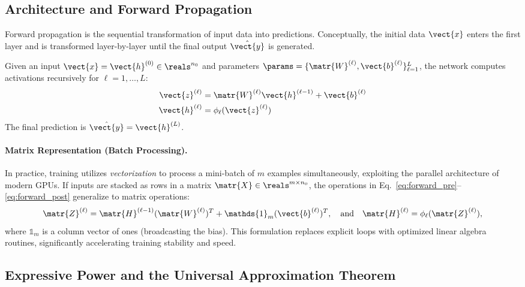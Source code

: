 \subsection{Architecture and Forward Propagation}

Forward propagation is the sequential transformation of input data into predictions. Conceptually, the initial data $\vect{x}$ enters the first layer and is transformed layer-by-layer until the final output $\hat{\vect{y}}$ is generated.

\begin{definition}
    Given an input $\vect{x} = \vect{h}^{(0)} \in \reals^{n_0}$ and parameters $\params = \{\matr{W}^{(\ell)}, \vect{b}^{(\ell)}\}_{\ell=1}^L$, the network computes activations recursively for $\ell = 1, \ldots, L$:
    \begin{align}
        \vect{z}^{(\ell)} &= \matr{W}^{(\ell)} \vect{h}^{(\ell-1)} + \vect{b}^{(\ell)} \label{eq:forward_pre} \\
        \vect{h}^{(\ell)} &= \phi_\ell(\vect{z}^{(\ell)}) \label{eq:forward_post}
    \end{align}
    The final prediction is $\hat{\vect{y}} = \vect{h}^{(L)}$.
\end{definition}

\paragraph{Matrix Representation (Batch Processing).}
In practice, training utilizes \emph{vectorization} to process a mini-batch of $m$ examples simultaneously, exploiting the parallel architecture of modern GPUs. If inputs are stacked as rows in a matrix $\matr{X} \in \reals^{m \times n_0}$, the operations in Eq.~\ref{eq:forward_pre}--\ref{eq:forward_post} generalize to matrix operations:
\begin{equation}
    \matr{Z}^{(\ell)} = \matr{H}^{(\ell-1)} (\matr{W}^{(\ell)})^T + \mathds{1}_m (\vect{b}^{(\ell)})^T, \quad \text{and} \quad \matr{H}^{(\ell)} = \phi_\ell(\matr{Z}^{(\ell)}),
\end{equation}
where $\mathds{1}_m$ is a column vector of ones (broadcasting the bias). This formulation replaces explicit loops with optimized linear algebra routines, significantly accelerating training stability and speed.

\subsection{Expressive Power and the Universal Approximation Theorem}


